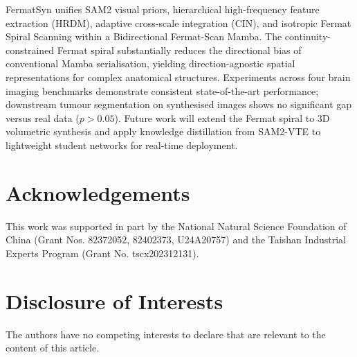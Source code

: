 \documentclass[runningheads]{llncs}
\begin{document}
FermatSyn unifies SAM2 visual priors, hierarchical high-frequency
feature extraction (HRDM), adaptive cross-scale integration (CIN),
and isotropic Fermat Spiral Scanning within a Bidirectional
Fermat-Scan Mamba. The continuity-constrained Fermat spiral substantially reduces
the directional bias of conventional Mamba serialisation, yielding
direction-agnostic spatial representations for complex anatomical
structures. Experiments across four brain imaging benchmarks demonstrate
consistent state-of-the-art performance; downstream tumour segmentation
on synthesised images shows no significant gap versus real data
($p{>}0.05$). Future work will extend the Fermat spiral to 3D
volumetric synthesis and apply knowledge distillation from SAM2-VTE
to lightweight student networks for real-time deployment.

\section*{Acknowledgements}
This work was supported in part by the National Natural Science Foundation of China (Grant Nos. 82372052, 82402373, U24A20757) and the Taishan Industrial Experts Program (Grant No. tscx202312131).

\section*{Disclosure of Interests}
The authors have no competing interests to declare that are relevant to the content of this article.



\end{document}
